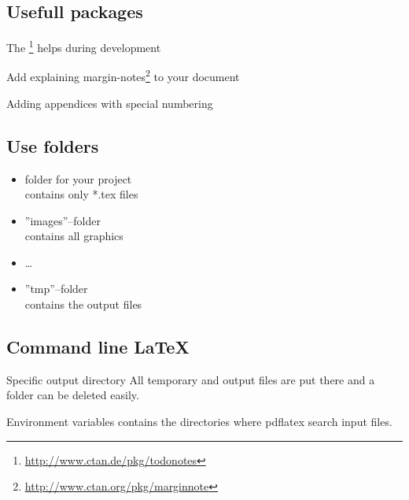 \subsection{Usefull packages}
\begin{frame}
	The \footnote{\url{http://www.ctan.de/pkg/todonotes}} helps
	during development
\end{frame}

\begin{frame}
	Add explaining
	margin-notes\footnote{\url{http://www.ctan.org/pkg/marginnote}} to your document

\end{frame}

\begin{frame}
	Adding appendices with special numbering

\end{frame}


\subsection{Use folders}
\begin{frame}
	\begin{itemize}
		\item folder for your project\\
			contains only *.tex files
		\item ''images''--folder\\
			contains all graphics
		\item \ldots
		\item ''tmp''--folder\\
			contains the output files
	\end{itemize}
\end{frame}

\subsection{Command line {\LaTeX}}
\begin{frame}

	\begin{block}{Specific output directory}
		All temporary and output files are put there and a folder can be
		deleted easily.
	\end{block}

	\begin{block}{Environment variables}
		 contains the directories where pdflatex search input
		files.
	\end{block}
\end{frame}

